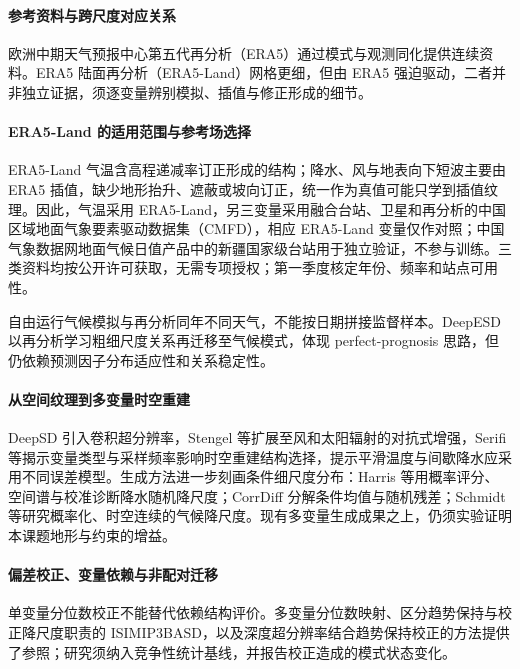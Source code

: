 \paragraph{参考资料与跨尺度对应关系}
欧洲中期天气预报中心第五代再分析（ERA5）通过模式与观测同化提供连续资料\cite{Hersbach2020ERA5}。ERA5 陆面再分析（ERA5-Land）网格更细，但由 ERA5 强迫驱动，二者并非独立证据，须逐变量辨别模拟、插值与修正形成的细节\cite{Munoz2021ERA5Land}。

\paragraph{ERA5-Land 的适用范围与参考场选择}
ERA5-Land 气温含高程递减率订正形成的结构；降水、风与地表向下短波主要由 ERA5 插值，缺少地形抬升、遮蔽或坡向订正\cite{Munoz2021ERA5Land}，统一作为真值可能只学到插值纹理。因此，气温采用 ERA5-Land，另三变量采用融合台站、卫星和再分析的中国区域地面气象要素驱动数据集（CMFD）\cite{He2020CMFD}，相应 ERA5-Land 变量仅作对照；中国气象数据网地面气候日值产品中的新疆国家级台站用于独立验证，不参与训练。三类资料均按公开许可获取，无需专项授权；第一季度核定年份、频率和站点可用性。

自由运行气候模拟与再分析同年不同天气，不能按日期拼接监督样本。DeepESD 以再分析学习粗细尺度关系再迁移至气候模式，体现 perfect-prognosis 思路\cite{Bano2022DeepESD}，但仍依赖预测因子分布适应性和关系稳定性。

\paragraph{从空间纹理到多变量时空重建}
DeepSD 引入卷积超分辨率\cite{DeepSD2017}，Stengel 等扩展至风和太阳辐射的对抗式增强\cite{Stengel2020}，Serifi 等揭示变量类型与采样频率影响时空重建结构选择\cite{Serifi2021}，提示平滑温度与间歇降水应采用不同误差模型。生成方法进一步刻画条件细尺度分布：Harris 等用概率评分、空间谱与校准诊断降水随机降尺度\cite{Harris2022}；CorrDiff 分解条件均值与随机残差\cite{Mardani2025CorrDiff}；Schmidt 等研究概率化、时空连续的气候降尺度\cite{Schmidt2025Coherent}。现有多变量生成成果之上，仍须实验证明本课题地形与约束的增益。

\paragraph{偏差校正、变量依赖与非配对迁移}
单变量分位数校正不能替代依赖结构评价。多变量分位数映射\cite{Cannon2018MBCn}、区分趋势保持与校正降尺度职责的 ISIMIP3BASD\cite{Lange2019ISIMIP}，以及深度超分辨率结合趋势保持校正的方法\cite{Trend2024}提供了参照；研究须纳入竞争性统计基线，并报告校正造成的模式状态变化。

